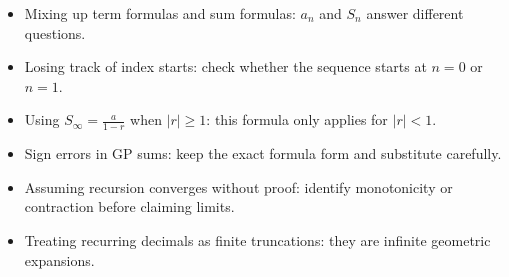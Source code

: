\begin{itemize}[leftmargin=*]
  \item Mixing up term formulas and sum formulas:
  $a_n$ and $S_n$ answer different questions.

  \item Losing track of index starts:
  check whether the sequence starts at $n=0$ or $n=1$.

  \item Using $S_\infty=\frac{a}{1-r}$ when $|r|\ge1$:
  this formula only applies for $|r|<1$.

  \item Sign errors in GP sums:
  keep the exact formula form and substitute carefully.

  \item Assuming recursion converges without proof:
  identify monotonicity or contraction before claiming limits.

  \item Treating recurring decimals as finite truncations:
  they are infinite geometric expansions.
\end{itemize}
